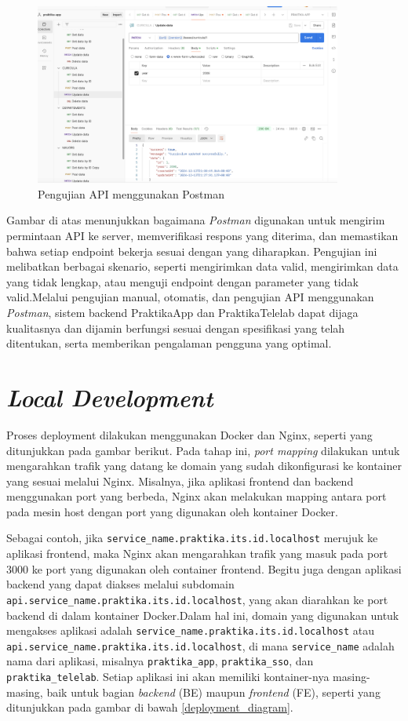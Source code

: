 \begin{figure}[H]
    \centering
    \includegraphics[width=0.9\textwidth]{gambar/postman.png}
    \caption{Pengujian API menggunakan Postman}
    \label{fig:postman_testing}
\end{figure}

Gambar di atas menunjukkan bagaimana \emph{Postman} digunakan untuk mengirim permintaan API ke server, memverifikasi respons yang diterima, dan memastikan bahwa setiap endpoint bekerja sesuai dengan yang diharapkan. Pengujian ini melibatkan berbagai skenario, seperti mengirimkan data valid, mengirimkan data yang tidak lengkap, atau menguji endpoint dengan parameter yang tidak valid.Melalui pengujian manual, otomatis, dan pengujian API menggunakan \emph{Postman}, sistem backend PraktikaApp dan PraktikaTelelab dapat dijaga kualitasnya dan dijamin berfungsi sesuai dengan spesifikasi yang telah ditentukan, serta memberikan pengalaman pengguna yang optimal.

\section{\emph{Local Development}}

Proses deployment dilakukan menggunakan Docker dan Nginx, seperti yang ditunjukkan pada gambar berikut. Pada tahap ini, \emph{port mapping} dilakukan untuk mengarahkan trafik yang datang ke domain yang sudah dikonfigurasi ke kontainer yang sesuai melalui Nginx. Misalnya, jika aplikasi frontend dan backend menggunakan port yang berbeda, Nginx akan melakukan mapping antara port pada mesin host dengan port yang digunakan oleh kontainer Docker.

Sebagai contoh, jika \texttt{service\_name.praktika.its.id.localhost} merujuk ke aplikasi frontend, maka Nginx akan mengarahkan trafik yang masuk pada port 3000 ke port yang digunakan oleh container frontend. Begitu juga dengan aplikasi backend yang dapat diakses melalui subdomain \texttt{api.service\_name.praktika.its.id.localhost}, yang akan diarahkan ke port backend di dalam kontainer Docker.Dalam hal ini, domain yang digunakan untuk mengakses aplikasi adalah \texttt{service\_name.praktika.its.id.localhost} atau \texttt{api.service\_name.praktika.its.id.localhost}, di mana \texttt{service\_name} adalah nama dari aplikasi, misalnya \texttt{praktika\_app}, \texttt{praktika\_sso}, dan \texttt{praktika\_telelab}. Setiap aplikasi ini akan memiliki kontainer-nya masing-masing, baik untuk bagian \emph{backend} (BE) maupun \emph{frontend} (FE), seperti yang ditunjukkan pada gambar di bawah \ref{deployment_diagram}.

